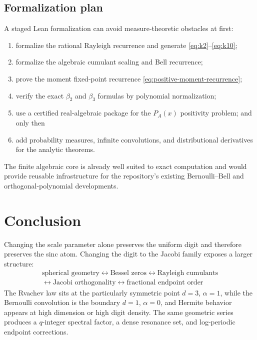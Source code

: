 \documentclass[11pt]{article}
\theoremstyle{definition}
\theoremstyle{remark}
\begin{document}
\subsection{Formalization plan}

A staged Lean formalization can avoid measure-theoretic obstacles at first:
\begin{enumerate}[label=\arabic*.]
 \item formalize the rational Rayleigh recurrence and generate
       \eqref{eq:k2}--\eqref{eq:k10};
 \item formalize the algebraic cumulant scaling and Bell recurrence;
 \item prove the moment fixed-point recurrence
       \eqref{eq:positive-moment-recurrence};
 \item verify the exact \(\beta_2\) and \(\beta_3\) formulas by polynomial
       normalization;
 \item use a certified real-algebraic package for the
       \(P_A(x)\) positivity problem; and only then
 \item add probability measures, infinite convolutions, and distributional
       derivatives for the analytic theorems.
\end{enumerate}
The finite algebraic core is already well suited to exact computation and
would provide reusable infrastructure for the repository's existing
Bernoulli--Bell and orthogonal-polynomial developments.

\section{Conclusion}

Changing the scale parameter alone preserves the uniform digit and therefore
preserves the sinc atom.  Changing the digit to the Jacobi family exposes a
larger structure:
\[
 \boxed{\begin{gathered}
 \text{spherical geometry}
 \longleftrightarrow
 \text{Bessel zeros}
 \longleftrightarrow
 \text{Rayleigh cumulants}\\
 \longleftrightarrow
 \text{Jacobi orthogonality}
 \longleftrightarrow
 \text{fractional endpoint order}
 \end{gathered}}
\]
The Rvachev law sits at the particularly symmetric point \(d=3\),
\(\alpha=1\), while the Bernoulli convolution is the boundary \(d=1\),
\(\alpha=0\), and Hermite behavior appears at high dimension or high digit
density.  The same geometric series produces a \(q\)-integer spectral factor,
a dense resonance set, and log-periodic endpoint corrections.
\end{document}

